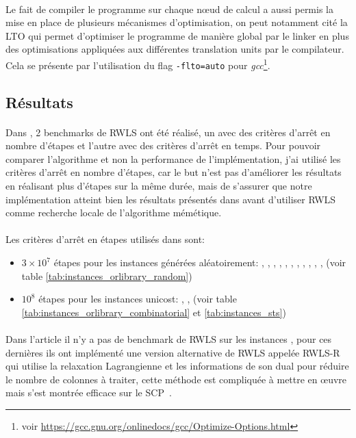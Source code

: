 \documentclass[a4paper,11pt,twoside,french,report]{../common/simplem}
\begin{document}
				\paragraph*{}
					Le fait de compiler le programme sur chaque nœud de calcul a aussi permis la mise en place de plusieurs mécanismes d'optimisation, on peut notamment cité la \gls{LTO} qui permet d'optimiser le programme de manière global par le linker en plus des optimisations appliquées aux différentes translation units par le compilateur. Cela se présente par l'utilisation du flag \texttt{-flto=auto} pour \textit{gcc}\footnote{voir \url{https://gcc.gnu.org/onlinedocs/gcc/Optimize-Options.html}}.
			\subsection{Résultats}
				\paragraph*{}
					Dans \cite{Gao2015}, 2 benchmarks de \gls{RWLS} ont été réalisé, un avec des critères d'arrêt en nombre d'étapes et l'autre avec des critères d'arrêt en temps. Pour pouvoir comparer l'algorithme et non la performance de l'implémentation, j'ai utilisé les critères d'arrêt en nombre d'étapes, car le but n'est pas d'améliorer les résultats en réalisant plus d'étapes sur la même durée, mais de s'assurer que notre implémentation atteint bien les résultats présentés dans \cite{Gao2015} avant d'utiliser \gls{RWLS} comme recherche locale de l'algorithme mémétique.
				\paragraph*{}
					Les critères d'arrêt en étapes utilisés dans \cite{Gao2015} sont:
					\begin{itemize}
						\item \(3 \times 10^7\) étapes pour les instances générées aléatoirement: , , , , , , , , , , ,  (voir table \ref{tab:instances_orlibrary_random})
						\item \(10^8\) étapes pour les instances unicost: , ,  (voir table \ref{tab:instances_orlibrary_combinatorial} et \ref{tab:instances_sts})
					\end{itemize}
				\paragraph*{}
					Dans l'article il n'y a pas de benchmark de \gls{RWLS} sur les instances , pour ces dernières ils ont implémenté une version alternative de \gls{RWLS} appelée \gls{RWLS}-R qui utilise la relaxation Lagrangienne et les informations de son dual pour réduire le nombre de colonnes à traiter, cette méthode est compliquée à mettre en œuvre mais s'est montrée efficace sur le \gls{SCP}~\cite{Caprara2000,Yagiura2006}.
\end{document}
